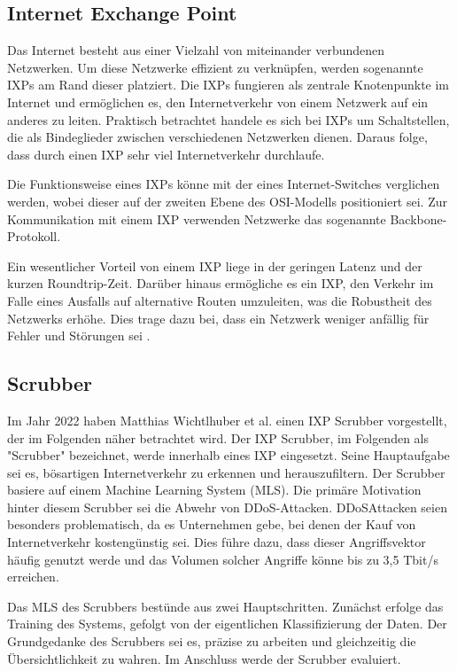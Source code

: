 \documentclass[sigplan,screen]{acmart}
\begin{document}
\subsection{Internet Exchange Point}
Das Internet besteht aus einer Vielzahl von miteinander verbundenen Netzwerken. Um diese Netzwerke effizient zu verknüpfen, werden sogenannte IXPs am Rand dieser platziert. Die IXPs fungieren als zentrale Knotenpunkte im Internet und ermöglichen es, den Internetverkehr von einem Netzwerk auf ein anderes zu leiten. Praktisch betrachtet handele es sich bei IXPs um Schaltstellen, die als Bindeglieder zwischen verschiedenen Netzwerken dienen. Daraus folge, dass durch einen IXP sehr viel Internetverkehr durchlaufe.

Die Funktionsweise eines IXPs könne mit der eines Internet-Switches verglichen werden, wobei dieser auf der zweiten Ebene des OSI-Modells positioniert sei. Zur Kommunikation mit einem IXP verwenden Netzwerke das sogenannte Backbone-Protokoll.

Ein wesentlicher Vorteil von einem IXP liege in der geringen Latenz und der kurzen Roundtrip-Zeit. Darüber hinaus ermögliche es ein IXP, den Verkehr im Falle eines Ausfalls auf alternative Routen umzuleiten, was die Robustheit des Netzwerks erhöhe. Dies trage dazu bei, dass ein Netzwerk weniger anfällig für Fehler und Störungen sei \cite{ixp01}. 

\subsection{Scrubber}
Im Jahr 2022 haben Matthias Wichtlhuber et al. \cite{Hohlfeld01} einen IXP Scrubber vorgestellt, der im Folgenden näher betrachtet wird. Der IXP Scrubber, im Folgenden als "Scrubber" bezeichnet, werde innerhalb eines IXP eingesetzt. Seine Hauptaufgabe sei es, bösartigen Internetverkehr zu erkennen und herauszufiltern. Der Scrubber basiere auf einem Machine Learning System (MLS). Die primäre Motivation hinter diesem Scrubber sei die Abwehr von DDoS-Attacken. DDoSAttacken seien besonders problematisch, da es Unternehmen gebe, bei denen der Kauf von Internetverkehr kostengünstig sei. Dies führe dazu, dass dieser Angriffsvektor häufig genutzt werde und das Volumen solcher Angriffe könne bis zu 3,5 Tbit/s erreichen.

Das MLS des Scrubbers bestünde aus zwei Hauptschritten. Zunächst erfolge das Training des Systems, gefolgt von der eigentlichen Klassifizierung der Daten. Der Grundgedanke des Scrubbers sei es, präzise zu arbeiten und gleichzeitig die Übersichtlichkeit zu wahren. Im Anschluss werde der Scrubber evaluiert.
\end{document}
